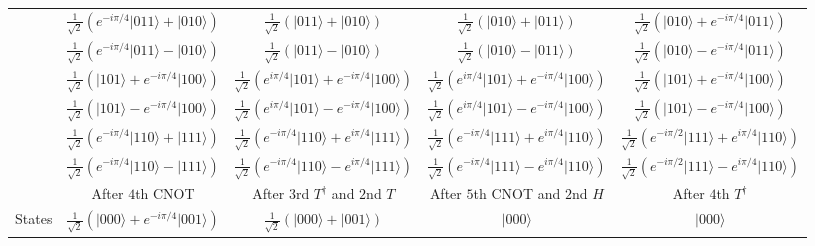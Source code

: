 \documentclass[en]{sol-man}
\begin{document}
\begin{pf}
\begin{table}[h]
\begin{tabular}{|c|c|c|c|c|}
             & $\frac{1}{\sqrt{2}}(e^{-i\pi/4}\lvert 011\rangle+\lvert 010\rangle)$ & $\frac{1}{\sqrt{2}}(\lvert 011\rangle+\lvert 010\rangle)$ & $\frac{1}{\sqrt{2}}(\lvert 010\rangle+\lvert 011\rangle)$ & $\frac{1}{\sqrt{2}}(\lvert 010\rangle+e^{-i\pi/4}\lvert 011\rangle)$ \\ \cline{2-5} 
             & $\frac{1}{\sqrt{2}}(e^{-i\pi/4}\lvert 011\rangle-\lvert 010\rangle)$ & $\frac{1}{\sqrt{2}}(\lvert 011\rangle-\lvert 010\rangle)$ & $\frac{1}{\sqrt{2}}(\lvert 010\rangle-\lvert 011\rangle)$ & $\frac{1}{\sqrt{2}}(\lvert 010\rangle-e^{-i\pi/4}\lvert 011\rangle)$ \\ \cline{2-5} 
             & $\frac{1}{\sqrt{2}}(\lvert 101\rangle+e^{-i\pi/4}\lvert 100\rangle)$ & $\frac{1}{\sqrt{2}}(e^{i\pi/4}\lvert 101\rangle+e^{-i\pi/4}\lvert 100\rangle)$ & $\frac{1}{\sqrt{2}}(e^{i\pi/4}\lvert 101\rangle+e^{-i\pi/4}\lvert 100\rangle)$ & $\frac{1}{\sqrt{2}}(\lvert 101\rangle+e^{-i\pi/4}\lvert 100\rangle)$ \\ \cline{2-5} 
             & $\frac{1}{\sqrt{2}}(\lvert 101\rangle-e^{-i\pi/4}\lvert 100\rangle)$ & $\frac{1}{\sqrt{2}}(e^{i\pi/4}\lvert 101\rangle-e^{-i\pi/4}\lvert 100\rangle)$ & $\frac{1}{\sqrt{2}}(e^{i\pi/4}\lvert 101\rangle-e^{-i\pi/4}\lvert 100\rangle)$ & $\frac{1}{\sqrt{2}}(\lvert 101\rangle-e^{-i\pi/4}\lvert 100\rangle)$ \\ \cline{2-5} 
             & $\frac{1}{\sqrt{2}}(e^{-i\pi/4}\lvert 110\rangle+\lvert 111\rangle)$ & $\frac{1}{\sqrt{2}}(e^{-i\pi/4}\lvert 110\rangle+e^{i\pi/4}\lvert 111\rangle)$ & $\frac{1}{\sqrt{2}}(e^{-i\pi/4}\lvert 111\rangle+e^{i\pi/4}\lvert 110\rangle)$ & $\frac{1}{\sqrt{2}}(e^{-i\pi/2}\lvert 111\rangle+e^{i\pi/4}\lvert 110\rangle)$ \\ \cline{2-5} 
             & $\frac{1}{\sqrt{2}}(e^{-i\pi/4}\lvert 110\rangle-\lvert 111\rangle)$ & $\frac{1}{\sqrt{2}}(e^{-i\pi/4}\lvert 110\rangle-e^{i\pi/4}\lvert 111\rangle)$ & $\frac{1}{\sqrt{2}}(e^{-i\pi/4}\lvert 111\rangle-e^{i\pi/4}\lvert 110\rangle)$ & $\frac{1}{\sqrt{2}}(e^{-i\pi/2}\lvert 111\rangle-e^{i\pi/4}\lvert 110\rangle)$ \\ \hline\hline
             & After $4$th CNOT & After $3$rd $T^{\dagger}$ and $2$nd $T$ & After $5$th CNOT and $2$nd $H$ & After $4$th $T^{\dagger}$ \\ \hline
            \multirow{8}{*}{States} & $\frac{1}{\sqrt{2}}(\lvert 000\rangle+e^{-i\pi/4}\lvert 001\rangle)$ & $\frac{1}{\sqrt{2}}(\lvert 000\rangle+\lvert 001\rangle)$ & $\lvert 000\rangle$ & $\lvert 000\rangle$ \\ \cline{2-5} 

\end{tabular}
\end{table}
\end{pf}
\end{document}
